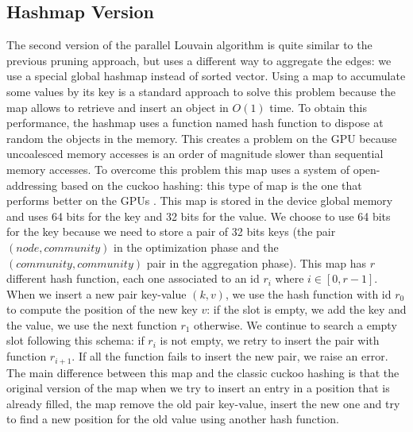 \subsection{Hashmap Version}
The second version of the parallel Louvain algorithm is quite similar to the previous pruning approach, but uses a different way to aggregate the edges: we use a special global hashmap instead of sorted vector.
Using a map to accumulate some values by its key is a standard approach to solve this problem because the map allows to retrieve and insert an object in $O(1)$ time. 
To obtain this performance, the hashmap uses a function named hash function to dispose at random the objects in the memory. This creates a problem on the GPU because uncoalesced memory accesses is an order of magnitude slower than sequential memory accesses. 
To overcome this problem this map uses a system of open-addressing based on the cuckoo hashing: this type of map is the one that performs better on the GPUs \cite{alcantara2012building}. This map is stored in the device global memory and uses 64 bits for the key and 32 bits for the value. We choose to use 64 bits for the key because we need to store a pair of 32 bits keys (the pair $(node, community)$ in the optimization phase and the $(community, community)$ pair in the aggregation phase). This map has $r$ different hash function, each one associated to an id $r_i$ where $i \in [0, r-1]$. When we insert a new pair key-value $(k,v)$, we use the hash function with id $r_0$ to compute the position of the new key $v$: if the slot is empty, we add the key and the value, we use the next function $r_1$ otherwise. We continue to search a empty slot following this schema: if $r_i$ is not empty, we retry to insert the pair with function $r_{i+1}$. If all the function fails to insert the new pair, we raise an error.\\ 
The main difference between this map and the classic cuckoo hashing is that 
the original version of the map when we try to insert an entry in a position that is already filled, the map remove the old pair key-value, insert the new one and try to find a new position for the old value using another hash function.  

